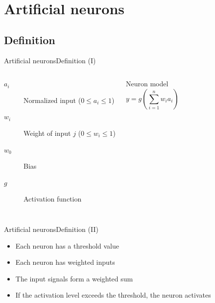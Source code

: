 \documentclass[10pt,compress]{beamer} %
\begin{document}
\section{Artificial neurons}

\subsection{Definition}

\begin{frame}{Artificial neurons}{Definition (I)}

    

	\bigskip
    \begin{columns}
		\begin{description}
		\item[$a_i$] Normalized input ($0 \le a_i \le 1$)
		\item[$w_{i}$] Weight of input $j$ ($0 \le w_{i} \le 1$)
		\item[$w_{0}$] Bias
		\item[$g$] Activation function
		\end{description}

	   \begin{block}{Neuron model}
	   \vspace{-0.5cm}
	   \begin{equation*}
	   y=g\left( \sum_{i=1}^n w_{i} a_i \right)
	   \end{equation*}
	   \end{block}
    \end{columns}
\end{frame}


\begin{frame}{Artificial neurons}{Definition (II)}
	\begin{itemize}
	\item Each neuron has a threshold value
	\item Each neuron has weighted inputs
	\item The input signals form a weighted sum
	\item If the activation level exceeds the threshold, the neuron activates
	\end{itemize}
\end{frame}
\end{document}
